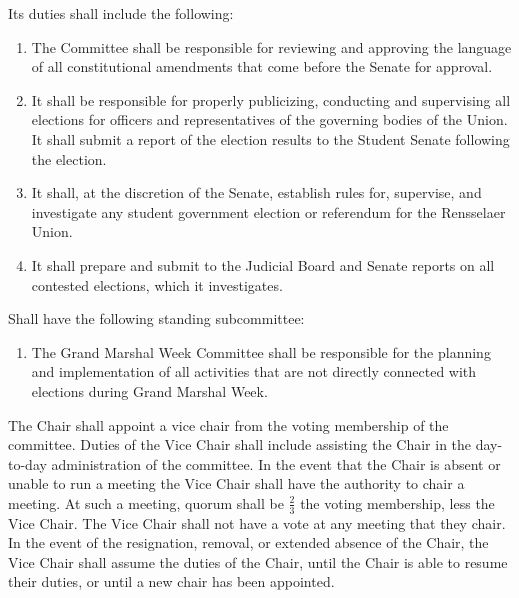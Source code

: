 \begin{enumerate}
{ \bf \item Its duties shall include the following:
\begin{enumerate}
\item The Committee shall be responsible for reviewing and approving the language of all constitutional amendments that
come before the Senate for approval.
\item It shall be responsible for properly publicizing, conducting and supervising all elections for officers and
representatives of the governing bodies of the Union. It shall submit a report of the election results to the Student
Senate following the election.
\item It shall, at the discretion of the Senate, establish rules for, supervise, and investigate any student government election or referendum for the Rensselaer Union.
\item It shall prepare and submit to the Judicial Board and Senate reports on all contested elections, which it investigates.
\end{enumerate} }

\item Shall have the following standing subcommittee:
\begin{enumerate}
\item The Grand Marshal Week Committee shall be responsible for the planning and implementation of all activities that
are not directly connected with elections during Grand Marshal Week.
\end{enumerate}

\item The Chair shall appoint a vice chair from the voting membership of the committee. Duties of the Vice Chair shall include
assisting the Chair in the day-to-day administration of the committee. In the event that the Chair is absent or unable to run a
meeting the Vice Chair shall have the authority to chair a meeting. At such a meeting, quorum shall be $\frac{2}{3}$ the voting
membership, less the Vice Chair. The Vice Chair shall not have a vote at any meeting that they chair. In the event of the
resignation, removal, or extended absence of the Chair, the Vice Chair shall assume the duties of the Chair, until the Chair
is able to resume their duties, or until a new chair has been appointed.
\end{enumerate}
